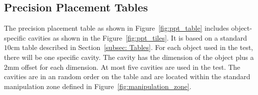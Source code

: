 \subsection{Precision Placement Tables}\label{sec:Precision Placement}

The precision placement table as shown in Figure~\ref{fig:ppt_table} includes object-specific cavities as shown in the Figure~\ref{fig:ppt_tiles}. It is based on a standard $10\si{\centi\meter}$ table described in Section~\ref{subsec: Tables}. For each object used in the test, there will be one specific cavity. The cavity has the dimension of the object plus a $2 \si{\milli\meter}$ offset for each dimension. At most five cavities are used in the test. The cavities are in an random order on the table and are located within the standard manipulation zone defined in Figure~\ref{fig:manipulation_zone}. 

